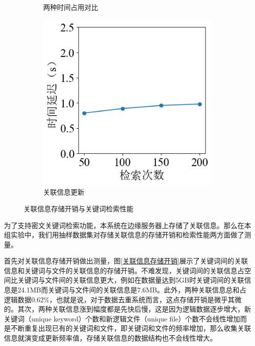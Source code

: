 \documentclass[promaster]{thesis-uestc}
\begin{document}
\begin{figure}[htbp]
\begin{subfigure}{0.40\textwidth}
        \centering
        \captionsetup{width=\textwidth}
        \caption{两种时间占用对比}
        \label{关键词检索性能1}
    \end{subfigure}
    \begin{subfigure}{0.425\textwidth}
        \includegraphics[width=1\linewidth]{pic/time_search_num.png}
        \centering
        \captionsetup{width=\textwidth}
        \caption{关联信息更新}
        \label{关键词检索性能2}
    \end{subfigure}
    \caption{关联信息存储开销与关键词检索性能}
    \label{关联信息存储开销与关键词检索性能}
\end{figure}
为了支持密文关键词检索功能，本系统在边缘服务器上存储了关联信息。那么在本组实验中，我们用抽样数据集对存储关联信息的存储开销和检索性能两方面做了测量。

首先对关联信息存储开销做出测量，图\ref{关联信息存储开销}展示了关键词间的关联信息和关键词与文件的关联信息的存储开销。不难发现，关键词间的关联信息占空间比关键词与文件间的关联信息更大，例如在数据量达到5GB时关键词间的关联信息是24.1MB而关键词与文件间的关联信息是7.6MB。此外，两种关联信息总和占逻辑数据0.62\%，也就是说，对于数据去重系统而言，这点存储开销是微乎其微的。其次，两种关联信息涨到幅度都是先快后慢，这是因为逻辑数据逐步增大，新关键词（unique keyword）个数和新逻辑文件（unique file）个数不会线性增加而是不断重复出现已有的关键词和文件，即关键词和文件的频率增加，那么收集关联信息就演变成更新频率值，存储关联信息的数据结构也不会线性增大。
\end{document}
